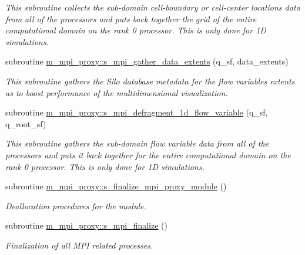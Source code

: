 \begin{Indent}
\begin{DoxyCompactItemize}
\begin{DoxyCompactList}\small\item\em This subroutine collects the sub-\/domain cell-\/boundary or cell-\/center locations data from all of the processors and puts back together the grid of the entire computational domain on the rank 0 processor. This is only done for 1D simulations. \end{DoxyCompactList}\item 
subroutine \hyperlink{namespacem__mpi__proxy_a0b226acd5a9097566685604292c3ae0d}{m\+\_\+mpi\+\_\+proxy\+::s\+\_\+mpi\+\_\+gather\+\_\+data\+\_\+extents} (q\+\_\+sf, data\+\_\+extents)
\begin{DoxyCompactList}\small\item\em This subroutine gathers the Silo database metadata for the flow variable\textquotesingle{}s extents as to boost performance of the multidimensional visualization. \end{DoxyCompactList}\item 
subroutine \hyperlink{namespacem__mpi__proxy_ae5286531f6390643aad1e4db5d5f6d91}{m\+\_\+mpi\+\_\+proxy\+::s\+\_\+mpi\+\_\+defragment\+\_\+1d\+\_\+flow\+\_\+variable} (q\+\_\+sf, q\+\_\+root\+\_\+sf)
\begin{DoxyCompactList}\small\item\em This subroutine gathers the sub-\/domain flow variable data from all of the processors and puts it back together for the entire computational domain on the rank 0 processor. This is only done for 1D simulations. \end{DoxyCompactList}\item 
subroutine \hyperlink{namespacem__mpi__proxy_ac984c84fe4140876d6600250af9807da}{m\+\_\+mpi\+\_\+proxy\+::s\+\_\+finalize\+\_\+mpi\+\_\+proxy\+\_\+module} ()
\begin{DoxyCompactList}\small\item\em Deallocation procedures for the module. \end{DoxyCompactList}\item 
subroutine \hyperlink{namespacem__mpi__proxy_a43fbda10c02ec8bc1fc572c83090f2e5}{m\+\_\+mpi\+\_\+proxy\+::s\+\_\+mpi\+\_\+finalize} ()
\begin{DoxyCompactList}\small\item\em Finalization of all M\+PI related processes. \end{DoxyCompactList}\end{DoxyCompactItemize}
\end{Indent}
